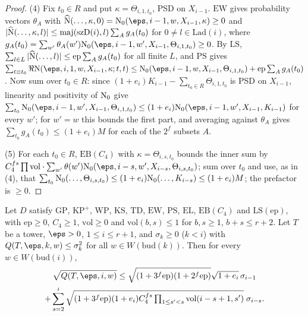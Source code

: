 \begin{proof}
(4) Fix $t_0\in R$ and put $\kappa=\Theta_{i,1,t_0}$, PSD on $X_{i-1}$. $\mathrm{EW}$ gives probability vectors
$\theta_A$ with $\thmSNh(\dots,\kappa,0)=\thmSNz(\eps,i-1,w,X_{i-1},\kappa)\ge0$ and
$|\widehat{\mathrm{N}}(\dots,\kappa,l)|\le\operatorname{maj}(\mathrm{szD}(i),l)\sum_Ag_A(t_0)$ for $0\ne l\in\mathrm{Lad}(i)$, where
$g_A(t_0)=\sum_{w'}\theta_A(w')\thmSNz(\eps,i-1,w',X_{i-1},\Theta_{i,1,t_0})\ge0$. By $\mathrm{LS}$,
$\sum_{l\in L}|\widehat{\mathrm{N}}(\dots,l)|\le\mathrm{ep}\sum_Ag_A(t_0)$ for all finite $L$, and $\mathrm{PS}$ gives
$\sum_{t\equiv t_0}\Re\thmSNst(\eps,i,1,w,X_{i-1},\kappa;t,t)\le\thmSNz(\eps,i-1,w,X_{i-1},\Theta_{i,1,t_0})+\mathrm{ep}\sum_Ag_A(t_0)$.
Now sum over $t_0\in R$: since $(1+e_i)K_{i-1}-\sum_{t_0\in R}\Theta_{i,1,t_0}$ is PSD on $X_{i-1}$, linearity and
positivity of $\mathrm{N}_0$ give $\sum_{t_0}\thmSNz(\eps,i-1,w',X_{i-1},\Theta_{i,1,t_0})\le(1+e_i)\thmSNz(\eps,i-1,w',X_{i-1},
K_{i-1})$ for every $w'$; for $w'=w$ this bounds the first part, and averaging against $\theta_A$ gives
$\sum_{t_0}g_A(t_0)\le(1+e_i)M$ for each of the $2^f$ subsets $A$.

(5) For each $t_0\in R$, $\mathrm{EB}(C_4)$ with $\kappa=\Theta_{i,s,t_0}$ bounds the inner sum by
$C_4^{fs}\prod\mathrm{vol}\cdot\sum_{w'}\theta(w')\thmSNz(\eps,i-s,w',X_{i-s},\Theta_{i,s,t_0})$; sum over $t_0$ and use, as in
(4), that $\sum_{t_0}\mathrm{N}_0(\dots,\Theta_{i,s,t_0})\le(1+e_i)\mathrm{N}_0(\dots,K_{i-s})\le(1+e_i)M$; the prefactor is $\ge0$.
\end{proof}

\begin{proposition}\label{pf:thmS:onelevel}
Let $D$ satisfy $\mathrm{GP}$, $\mathrm{KP}^{+}$, $\mathrm{WP}$, $\mathrm{KS}$,
$\mathrm{TD}$, $\mathrm{EW}$, $\mathrm{PS}$, $\mathrm{EL}$, $\mathrm{EB}(C_4)$ and
$\mathrm{LS}(\mathrm{ep})$, with $\mathrm{ep}\ge0$, $C_4\ge1$, $\mathrm{vol}\ge0$ and $\mathrm{vol}(b,s)\le1$ for
$b,s\ge1$, $b+s\le r+2$. Let $T$ be a tower, $\eps>0$, $1\le i\le r+1$, and $\sigma_k\ge0$ ($k<i$) with
$Q(T,\eps,k,w)\le\sigma_k^2$ for all $w\in W(\mathrm{bud}(k))$. Then for every $w\in W(\mathrm{bud}(i))$,
\begin{multline}\label{eq:pf:thmS:onelevel}
\sqrt{Q(T,\eps,i,w)}\le\sqrt{(1+3^f\mathrm{ep})(1+2^f\mathrm{ep})}\sqrt{1+e_i}\,\sigma_{i-1}\\
+\sum_{s=2}^i\sqrt{(1+3^f\mathrm{ep})(1+e_i)C_4^{fs}\textstyle\prod_{1\le s'<s}\mathrm{vol}(i-s+1,s')}\;\sigma_{i-s}.
\end{multline}
\end{proposition}

